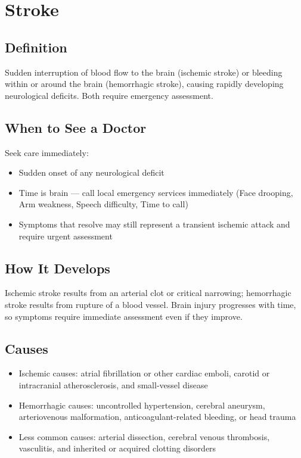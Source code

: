 \chapter{Stroke}

\section*{Definition}
Sudden interruption of blood flow to the brain (ischemic stroke) or bleeding within or around the brain (hemorrhagic stroke), causing rapidly developing neurological deficits. Both require emergency assessment.

\section*{When to See a Doctor}
Seek care immediately:
\begin{itemize}
  \item Sudden onset of any neurological deficit
  \item Time is brain --- call local emergency services immediately (Face drooping, Arm weakness, Speech difficulty, Time to call)
  \item Symptoms that resolve may still represent a transient ischemic attack and require urgent assessment
\end{itemize}

\section*{How It Develops}
Ischemic stroke results from an arterial clot or critical narrowing; hemorrhagic stroke results from rupture of a blood vessel. Brain injury progresses with time, so symptoms require immediate assessment even if they improve.

\section*{Causes}
\begin{itemize}
  \item Ischemic causes: atrial fibrillation or other cardiac emboli, carotid or intracranial atherosclerosis, and small-vessel disease
  \item Hemorrhagic causes: uncontrolled hypertension, cerebral aneurysm, arteriovenous malformation, anticoagulant-related bleeding, or head trauma
  \item Less common causes: arterial dissection, cerebral venous thrombosis, vasculitis, and inherited or acquired clotting disorders
\end{itemize}

